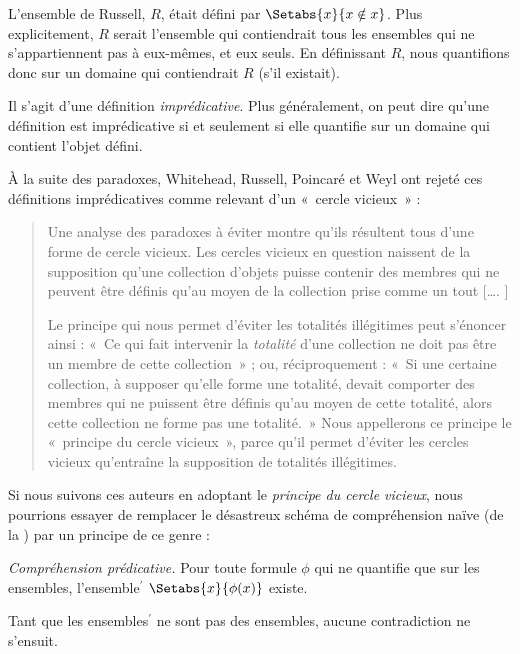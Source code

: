 \documentclass[../../../include/open-logic-section]{subfiles}
\begin{document}


L'ensemble de Russell, $R$, était défini par $\Setabs{x}{x \notin
x}$. Plus explicitement, $R$ serait l'ensemble qui contiendrait tous
les ensembles qui ne s'appartiennent pas à eux-mêmes, et eux seuls.
En définissant $R$, nous quantifions donc sur un domaine qui
contiendrait $R$ (s'il existait).

Il s'agit d'une définition \emph{imprédicative}. Plus généralement,
on peut dire qu'une définition est imprédicative si et seulement si
elle quantifie sur un domaine qui contient l'objet défini.

À la suite des paradoxes, Whitehead, Russell, Poincar\'{e} et Weyl
ont rejeté ces définitions imprédicatives comme relevant d'un «~cercle
vicieux~» :
\begin{quote}
	Une analyse des paradoxes à éviter montre qu'ils résultent tous
	d'une forme de cercle vicieux. Les cercles vicieux en question
	naissent de la supposition qu'une collection d'objets puisse
	contenir des membres qui ne peuvent être définis qu'au moyen de
	la collection prise comme un tout [\ldots. \textparagraph]

	Le principe qui nous permet d'éviter les totalités illégitimes
	peut s'énoncer ainsi : «~Ce qui fait intervenir la \emph{totalité}
	d'une collection ne doit pas être un membre de cette collection~» ;
	ou, réciproquement : «~Si une certaine collection, à supposer
	qu'elle forme une totalité, devait comporter des membres qui ne
	puissent être définis qu'au moyen de cette totalité, alors cette
	collection ne forme pas une totalité.~» Nous appellerons ce
	principe le «~principe du cercle vicieux~», parce qu'il permet
	d'éviter les cercles vicieux qu'entraîne la supposition de
	totalités illégitimes.
	\citep[p.~37]{WhiteheadRussell1910}
\end{quote}
Si nous suivons ces auteurs en adoptant le \emph{principe du cercle
vicieux}, nous pourrions essayer de remplacer le désastreux schéma de
compréhension naïve (de la ) par un
principe de ce genre :

\begin{defish}
\emph{Compréhension prédicative.} Pour toute formule $\phi$ qui ne quantifie que sur les ensembles, l'ensemble$^\prime$ $\Setabs{x}{\phi(x)}$ existe.
\end{defish}

Tant que les ensembles$^{\prime}$ ne sont pas des ensembles, aucune
contradiction ne s'ensuit.
\end{document}
